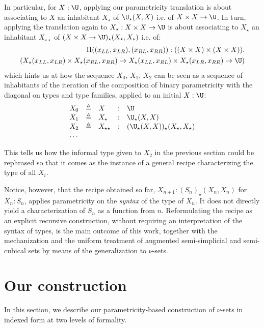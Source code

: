 \documentclass{art.cls/art}
\newcommand{\defeq}{\ensuremath{\triangleq}}
\newcommand{\kstar}{{\star}}
\begin{document}
In particular, for $X: \U$, applying our parametricity translation is about associating to $X$ an inhabitant $X_\kstar$ of ${\U}_\kstar(X,X)$ i.e. of $X \times X \rightarrow \U$. In turn, applying the translation again to $X_\kstar: X \times X \rightarrow \U$ is about associating to $X_\kstar$ an inhabitant $X_{\kstar\kstar}$ of $(X \times X \rightarrow \U)_\kstar(X_\kstar,X_\kstar)$ i.e. of:
\begin{align*}
  \Pi ((x_{LL},x_{LR}),(x_{RL},x_{RR})): ((X \times X) \times (X \times X)). \\
  (X_\kstar(x_{LL},x_{LR}) \times X_\kstar(x_{RL},x_{RR})
  \rightarrow X_\kstar(x_{LL}, x_{RL}) \times X_\kstar(x_{LR},x_{RR})  \rightarrow \U)
\end{align*}
which hints us at how the sequence $X_0$, $X_1$, $X_2$ can be seen as a sequence of inhabitants of the iteration of the composition of binary parametricity with the diagonal on types and type families, applied to an initial $X: \U$:
\begin{equation*}
  \begin{array}{lllll}
    X_0 & \defeq & X                & : & \U                                             \\
    X_1 & \defeq & X_\kstar         & : & {\U}_\kstar(X,X)                               \\
    X_2 & \defeq & X_{\kstar\kstar} & : & ({\U}_\kstar(X,X))_{\kstar}(X_\kstar,X_\kstar) \\
    \ldots
  \end{array}
\end{equation*}

This tells us how the informal type given to $X_2$ in the previous section could be rephrased so that it comes as the instance of a general recipe characterizing the type of all $X_i$.

Notice, however, that the recipe obtained so far, $X_{n + 1}: ({S_n})_\kstar(X_n,X_n)$ for $X_n: S_n$, applies parametricity on the \emph{syntax} of the type of $X_n$. It does not directly yield a characterization of $S_n$ as a function from $n$. Reformulating the recipe as an explicit recursive construction, without requiring an interpretation of the syntax of types, is the main outcome of this work, together with the mechanization and the uniform treatment of augmented semi-simplicial and semi-cubical sets by means of the generalization to $\nu$-sets.

\section{Our construction}
In this section, we describe our parametricity-based construction of $\nu$-sets in indexed form at two levels of formality.
\end{document}
